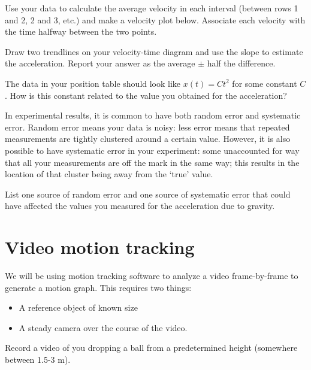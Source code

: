 \documentclass{handout}
\begin{document}
\vspace{\baselineskip}
\begin{questions}
    \question Use your data to calculate the average velocity in each interval (between rows 1 and 2, 2 and 3, etc.) and make a velocity plot below. Associate each velocity with the time halfway between the two points.
\end{questions}
\clearpage
\begin{questions}
    \question Draw two trendlines on your velocity-time diagram and use the slope to estimate the acceleration. Report your answer as the average $\pm$ half the difference.

    \answerspace{2in}

    \question The data in your position table should look like $x(t)=Ct^2$ for some constant $C$. How is this constant related to the value you obtained for the acceleration?

    \answerspace{2in}

\end{questions}
In experimental results, it is common to have both random error and systematic error. Random error means your data is noisy: less error means that repeated measurements are tightly clustered around a certain value. However, it is also possible to have systematic error in your experiment: some unaccounted for way that all your measurements are off the mark in the same way; this results in the location of that cluster being away from the `true' value.
\begin{questions}
    \question List one source of random error and one source of systematic error that could have affected the values you measured for the acceleration due to gravity.
\end{questions}
\clearpage

\section{Video motion tracking}
We will be using motion tracking software to analyze a video frame-by-frame to generate a motion graph. This requires two things:
\begin{itemize}
    \item A reference object of known size
    \item A steady camera over the course of the video.
\end{itemize}
Record a video of you dropping a ball from a predetermined height (somewhere between 1.5-3 m).
\end{document}
